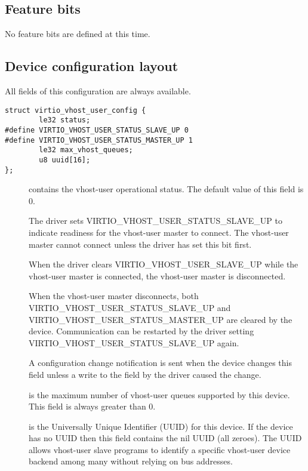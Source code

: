 \subsection{Feature bits}\label{sec:Device Types / Vhost-user Device Backend / Feature bits}

No feature bits are defined at this time.

\subsection{Device configuration layout}\label{sec:Device Types / Vhost-user Device Backend / Device configuration layout}

  All fields of this configuration are always available.

\begin{lstlisting}
struct virtio_vhost_user_config {
        le32 status;
#define VIRTIO_VHOST_USER_STATUS_SLAVE_UP 0
#define VIRTIO_VHOST_USER_STATUS_MASTER_UP 1
        le32 max_vhost_queues;
        u8 uuid[16];
};
\end{lstlisting}

\begin{description}
\item[] contains the vhost-user operational status.  The default
    value of this field is 0.

    The driver sets VIRTIO_VHOST_USER_STATUS_SLAVE_UP to indicate readiness for
    the vhost-user master to connect.  The vhost-user master cannot connect
    unless the driver has set this bit first.

    When the driver clears VIRTIO_VHOST_USER_SLAVE_UP while the vhost-user
    master is connected, the vhost-user master is disconnected.

    When the vhost-user master disconnects, both
    VIRTIO_VHOST_USER_STATUS_SLAVE_UP and VIRTIO_VHOST_USER_STATUS_MASTER_UP
    are cleared by the device.  Communication can be restarted by the driver
    setting VIRTIO_VHOST_USER_STATUS_SLAVE_UP again.

    A configuration change notification is sent when the device changes
    this field unless a write to the field by the driver caused the change.

\item[] is the maximum number of vhost-user queues
    supported by this device.  This field is always greater than 0.

\item[] is the Universally Unique Identifier (UUID) for this
    device.  If the device has no UUID then this field contains the nil
    UUID (all zeroes).  The UUID allows vhost-user slave programs to identify a
    specific vhost-user device backend among many without relying on bus
    addresses.
\end{description}

